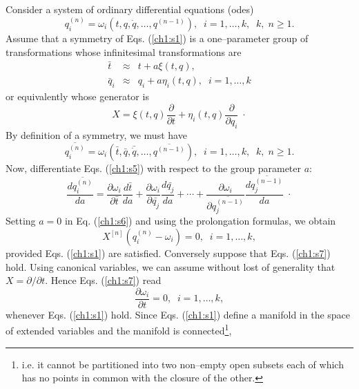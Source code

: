 Consider a system of ordinary differential equations (odes)
\begin{equation}
\label{ch1:s1}
q_i^{(n)}=\omega_i (t,q,\dot q,\ldots,q^{(n-1)}),
\;\;i=1,\ldots,k,\;\;k,\;n \ge 1.
\end{equation}
Assume that a symmetry of Eqs. (\ref{ch1:s1}) is a one--parameter group of
transformations whose infinitesimal transformations are
\begin{eqnarray}
\bar t &\approx & t+a\xi (t,q), \label{ch1:s2}\\
\bar q_i &\approx & q_i+a\eta_i (t,q),\;\;i=1,\ldots,k \label{ch1:s3}
\end{eqnarray}
or equivalently whose generator is
\begin{equation}
\label{ch1:s4}
X=\xi (t,q)\frac{\partial}{\partial t}
+\eta_i (t,q)\frac{\partial}{\partial q_i}\; \cdot
\end{equation}
By definition of a symmetry, we must have
\begin{equation}
\label{ch1:s5}
\overline{q_i^{(n)}}=\omega_i (\bar t,\bar q,\bar{\dot q},\ldots,\overline{q^{(n-1)}}),
\;\;i=1,\ldots,k,\;\;k,\;n \ge 1.
\end{equation}
Now, differentiate Eqs. (\ref{ch1:s5}) with respect to the
group parameter $a$:
\begin{equation}
\label{ch1:s6}
\frac{d \overline{q_i^{(n)}}}{da}=
\frac{\partial \omega_i}{\partial \bar t}
\frac{d \bar t }{d a}+
\frac{\partial \omega_i}{\partial \bar{q_j}}
\frac{d \bar{q_j}}{d a}+\cdots +
\frac{\partial \omega_i}{\partial \overline{q_j^{(n-1)}}}
\frac{d \overline{q_j^{(n-1)}}}{d a}\; \cdot
\end{equation}
Setting $a=0$ in Eq. (\ref{ch1:s6}) and  using the prolongation formulas, we
obtain
\begin{equation}
\label{ch1:s7}
X^{[n]} (q_i^{(n)}-\omega_i)=0,\;\; i=1,\ldots,k,
\end{equation}
provided Eqs. (\ref{ch1:s1}) are satisfied.  Conversely suppose that
Eqs. (\ref{ch1:s7})
hold. Using canonical variables, we can assume without lost of generality
that $X=\partial /\partial t$. Hence Eqs. (\ref{ch1:s7}) read
\begin{equation}
\label{ch1:s8}
 \frac{\partial \omega_i}{\partial t}=0,\;\; i=1,\ldots,k,
\end{equation}
whenever Eqs. (\ref{ch1:s1}) hold. Since Eqs. (\ref{ch1:s1}) define a manifold in the
space of extended variables and the manifold is connected\footnote{i.e.
it cannot be partitioned into two non--empty open subsets
each of which has no points in common with the closure of the other.},
